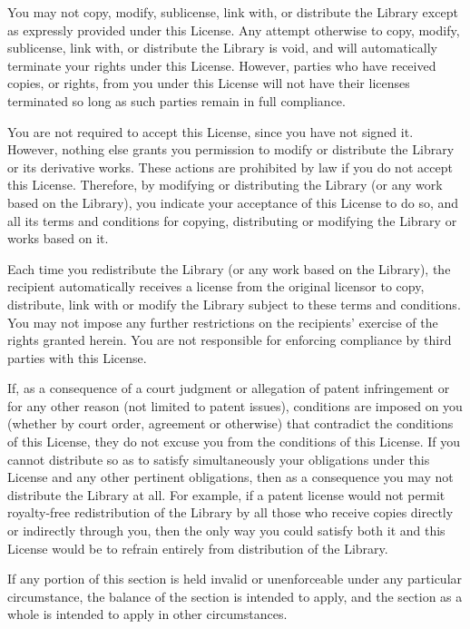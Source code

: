 \begin{DoxyEnumerate}
\item You may not copy, modify, sublicense, link with, or distribute the Library except as expressly provided under this License. Any attempt otherwise to copy, modify, sublicense, link with, or distribute the Library is void, and will automatically terminate your rights under this License. However, parties who have received copies, or rights, from you under this License will not have their licenses terminated so long as such parties remain in full compliance.
\item You are not required to accept this License, since you have not signed it. However, nothing else grants you permission to modify or distribute the Library or its derivative works. These actions are prohibited by law if you do not accept this License. Therefore, by modifying or distributing the Library (or any work based on the Library), you indicate your acceptance of this License to do so, and all its terms and conditions for copying, distributing or modifying the Library or works based on it.
\item Each time you redistribute the Library (or any work based on the Library), the recipient automatically receives a license from the original licensor to copy, distribute, link with or modify the Library subject to these terms and conditions. You may not impose any further restrictions on the recipients' exercise of the rights granted herein. You are not responsible for enforcing compliance by third parties with this License.
\item If, as a consequence of a court judgment or allegation of patent infringement or for any other reason (not limited to patent issues), conditions are imposed on you (whether by court order, agreement or otherwise) that contradict the conditions of this License, they do not excuse you from the conditions of this License. If you cannot distribute so as to satisfy simultaneously your obligations under this License and any other pertinent obligations, then as a consequence you may not distribute the Library at all. For example, if a patent license would not permit royalty-\/free redistribution of the Library by all those who receive copies directly or indirectly through you, then the only way you could satisfy both it and this License would be to refrain entirely from distribution of the Library.
\end{DoxyEnumerate}

If any portion of this section is held invalid or unenforceable under any particular circumstance, the balance of the section is intended to apply, and the section as a whole is intended to apply in other circumstances.

